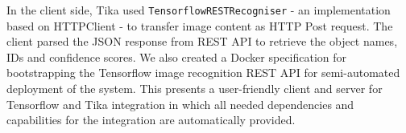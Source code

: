 
In the client side, Tika used \texttt{TensorflowRESTRecogniser} - an implementation based on HTTPClient - to transfer image content as HTTP Post request. The client parsed the JSON response from REST API to retrieve the object names, IDs and confidence scores. We also created a Docker specification for bootstrapping the Tensorflow image recognition REST API for semi-automated deployment of the system. This presents a user-friendly client and server for Tensorflow and Tika integration in which all needed dependencies and capabilities for the integration are automatically provided.

